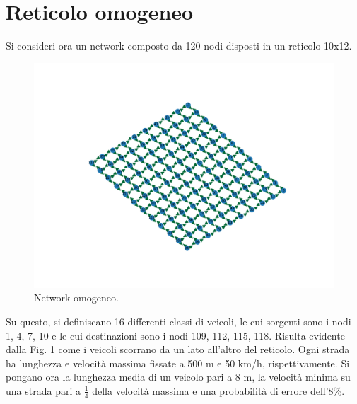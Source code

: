 \documentclass[../main.tex]{subfiles}
\begin{document}
\section{Reticolo omogeneo}
Si consideri ora un network composto da 120 nodi disposti in un reticolo 10x12.
\begin{figure}
    \includegraphics[scale=0.25, trim={2cm 5cm 10cm 5cm},clip]{./data/img/network.png}
    \caption[Network omogeneo]{Network omogeneo.}
    \label{fig:network_homo}
\end{figure}
Su questo, si definiscano 16 differenti classi di veicoli, le cui sorgenti sono i nodi 1, 4, 7, 10 e le cui destinazioni sono i nodi 109, 112, 115, 118.
Risulta evidente dalla Fig. \ref{fig:network_homo} come i veicoli scorrano da un lato all'altro del reticolo.
Ogni strada ha lunghezza e velocit\`a massima fissate a 500 m e 50 km/h, rispettivamente.
Si pongano ora la lunghezza media di un veicolo pari a 8 m, la velocit\`a minima su una strada pari a $\frac{1}{4}$ della velocit\`a massima e una probabilit\`a di errore dell'8\%.
\end{document}
